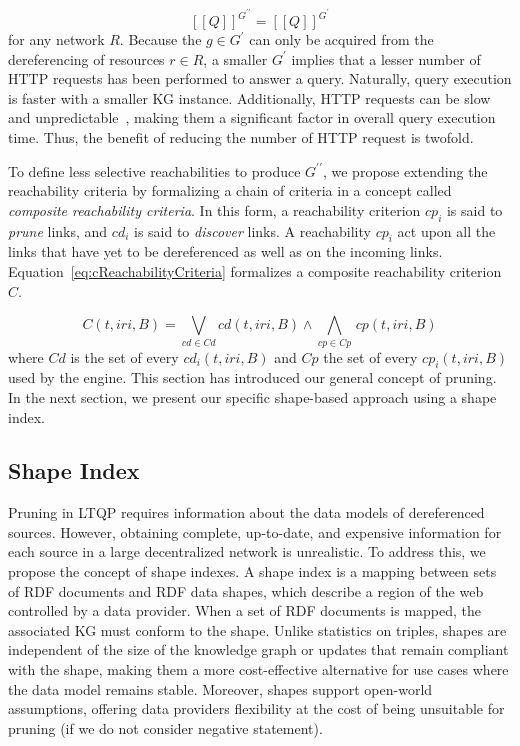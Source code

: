 \begin{equation}\label{eq:evalQueryStructuralAssumption}
   [\![ Q ]\!]^{G^{\prime\prime}} = [\![ Q ]\!]^{G^{\prime}}
\end{equation}
for any network $R$.
Because the $g \in G^{\prime}$ can only be acquired from the dereferencing of resources $r \in R$, a smaller $G^\prime$ implies that a lesser number of HTTP requests has been performed to answer a query.
Naturally, query execution is faster with a smaller KG instance.
Additionally, HTTP requests can be slow and unpredictable~\cite{hartig2016walking}, making them a significant factor in overall query execution time. 
Thus, the benefit of reducing the number of HTTP request is twofold.

To define less selective reachabilities to produce $G^{\prime\prime}$, we propose extending the reachability criteria by formalizing a chain of criteria in a concept called \emph{composite reachability criteria}.
In this form, a reachability criterion $cp_i$ is said to \emph{prune} links, and $cd_i$ is said to \emph{discover} links.
A reachability $cp_i$ act upon all the links that have yet to be dereferenced as well as on the incoming links.
Equation~\ref{eq:cReachabilityCriteria} formalizes a composite reachability criterion $C$.

\begin{equation}\label{eq:cReachabilityCriteria}
   C(t, iri, B) = \bigvee_{cd \in Cd} cd(t, iri, B) \mathrel{\land} \bigwedge_{cp \in Cp} \, cp(t, iri, B)
\end{equation}
where $Cd$ is the set of every $cd_i(t, iri, B)$ and $Cp$ the set of every $cp_i(t, iri, B)$ used by the engine.
This section has introduced our general concept of pruning. 
In the next section, we present our specific shape-based approach using a shape index.

\subsection{Shape Index}

Pruning in LTQP requires information about the data models of dereferenced sources.
However, obtaining complete, up-to-date, and expensive information for each source in a large decentralized network is unrealistic.
To address this, we propose the concept of shape indexes. 
A shape index is a mapping between sets of RDF documents and RDF data shapes, which describe a region of the web controlled by a data provider.
When a set of RDF documents is mapped, the associated KG must conform to the shape.
Unlike statistics on triples, shapes are independent of the size of the knowledge graph or updates that remain compliant with the shape, making them a more cost-effective alternative for use cases where the data model remains stable. 
Moreover, shapes support open-world assumptions, offering data providers flexibility at the cost of being unsuitable for pruning (if we do not consider negative statement).


